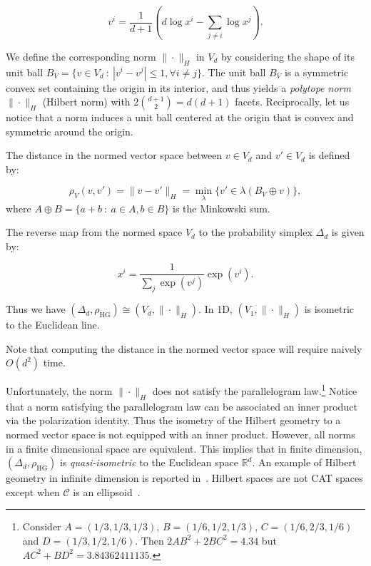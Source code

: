 \documentclass[graybox]{svmult}
\def\calC{\mathcal{C}}
\def\bbR{\mathbb{R}}
\def\st{\ :\ }
\def\HG{\mathrm{HG}}
\begin{document}
\begin{equation}
v^i = \frac{1}{d+1} \left(d\log x^i -\sum_{j\not =i}\log x^j \right).
\end{equation}

We define the corresponding norm $\|\cdot\|_H$ in $V_d$ by considering the shape of its unit ball 
$B_V=\{v\in V_d \st |v^i-v^j|\leq 1, \forall i\not =j\}$.
The unit ball $B_V$ is a symmetric convex set containing the origin in its interior, and thus yields a {\em polytope norm}
 $\|\cdot\|_H$ (Hilbert norm) with $2\binom{d+1}{2}=d(d+1)$ facets.
Reciprocally, let us notice that a norm induces a unit ball centered at the origin that is convex and symmetric around the origin.

The distance in the normed vector space between $v\in V_d$ and $v'\in V_d$ is defined by:

\begin{equation}
\rho_V(v,v')= \|v-v'\|_H = \min_\lambda \{v'\in \lambda(B_V\oplus v)\},
\end{equation}
where $A\oplus B=\{a+b \st a\in A,b\in B\}$ is the Minkowski sum.

The reverse map from the normed space  $V_d$ to the probability simplex $\Delta_d$ is given by:

\begin{equation}
x^i = \frac{1}{\sum_j \exp(v^j)} \exp({v^i}). 
\end{equation}


Thus we have $(\Delta_d,\rho_\HG)\cong (V_d,\|\cdot\|_H)$.
In 1D, $(V_1,\|\cdot\|_H)$ is isometric to the Euclidean line. 

Note that computing the distance in the normed vector space will require naively $O(d^2)$ time.

Unfortunately, the norm $\|\cdot\|_H$ does not satisfy the parallelogram law.\footnote{ Consider 
$A = (1/3,1/3,1/3)$, $B = (1/6,1/2,1/3)$, $C = (1/6,2/3,1/6)$ and
$D = (1/3,1/2,1/6)$. Then  $2AB^2 +2BC^2 = 4.34$ but $AC^2 + BD^2 = 3.84362411135$.
}
Notice that a norm satisfying the parallelogram law can be associated an inner product via the polarization identity.
Thus the isometry of the Hilbert geometry to a normed vector space is not equipped with an inner product.
However, all norms in a finite dimensional space are equivalent.
This implies that in finite dimension, $(\Delta_d,\rho_\HG)$ is {\em quasi-isometric} to the Euclidean space $\bbR^d$.
An example of Hilbert geometry in infinite dimension is reported in~\cite{HilbertHarpe-1991}.
Hilbert spaces are not CAT spaces except when $\calC$ is an ellipsoid~\cite{Vernicos-2004}.
\end{document}
